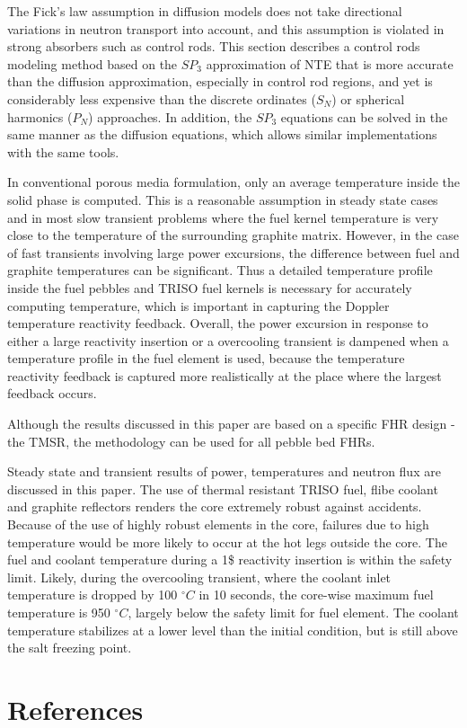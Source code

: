 \documentclass{elsarticle}
\begin{document}
The Fick's law assumption in diffusion models does not take directional variations in neutron transport into account, and this assumption is violated in strong absorbers such as control rods.
This section describes a control rods modeling method based on the $SP_3$ approximation of NTE that is more accurate than the diffusion approximation, especially in control rod regions, and yet is considerably less expensive than the discrete ordinates ($S_N$) or spherical harmonics ($P_N$) approaches. In addition, the $SP_3$ equations can be solved in the same manner as the diffusion equations, which allows similar implementations with the same tools.

In conventional porous media formulation, only an average temperature inside the solid phase is computed. This is a reasonable assumption in steady state cases and in most slow transient problems where the fuel kernel temperature is very close to the temperature of the surrounding graphite matrix. However, in the case of fast transients involving large power excursions, the difference between fuel and graphite temperatures can be significant. Thus a detailed temperature profile inside the fuel pebbles and TRISO fuel kernels is necessary for accurately computing temperature, which is important in capturing the Doppler temperature reactivity feedback.
Overall, the power excursion in response to either a large reactivity insertion or a overcooling transient is dampened when a temperature profile in the fuel element is used, because the temperature reactivity feedback is captured more realistically at the place where the largest feedback occurs. 


Although the results discussed in this paper are based on a specific FHR design - the TMSR, the methodology can be used for all pebble bed FHRs.

Steady state and transient results of power, temperatures and neutron flux are discussed in this paper. The use of thermal resistant TRISO fuel, flibe coolant and graphite reflectors renders the core extremely robust against accidents. 
Because of the use of highly robust elements in the core, failures due to high temperature would be more likely to occur at the hot legs outside the core.
The fuel and coolant temperature during a 1\$ reactivity insertion is within the safety limit.
Likely, during the overcooling transient, where the coolant inlet temperature is dropped by 100 $^{\circ}C$ in 10 seconds, the core-wise maximum fuel temperature is 950 $^{\circ}C$, largely below the safety limit for fuel element. The coolant temperature stabilizes at a lower level than the initial condition, but is still above the salt freezing point.


\section*{References}


\end{document}
